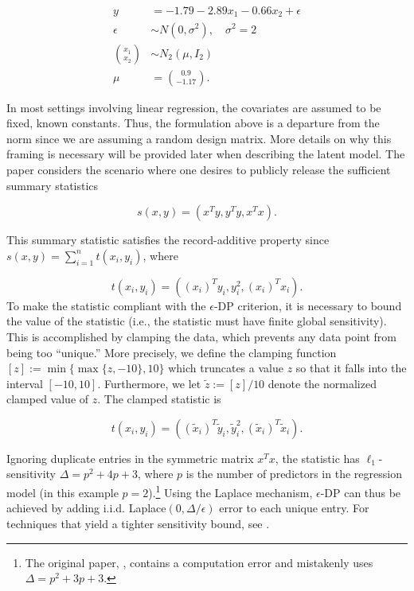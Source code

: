 \begin{equation*}
\begin{aligned}
y &= -1.79 -2.89x_1 -0.66x_2 + \epsilon\\
\epsilon &\sim N(0,\sigma^2), \quad \sigma^2 = 2\\
\binom{x_1}{x_2} &\sim N_{2}(\mu, I_2)\\
\mu &= \binom{0.9}{-1.17}.
\end{aligned}
\end{equation*}

In most settings involving linear regression, the covariates are assumed to be
fixed, known constants. Thus, the formulation above is a departure from the norm since
we are assuming a random design matrix. More details on why this framing is necessary
will be provided later when describing the latent model. The paper considers the scenario where one desires to publicly release the
sufficient summary statistics

\begin{equation*}
s(x,y) = (x^Ty, y^Ty, x^Tx).
\end{equation*}

This summary statistic satisfies the record-additive property since \(s(x,y) = \sum_{i=1}^{n} t(x_i, y_i)\),
where

\begin{equation*}
t(x_i,y_i) = ((x_{i})^T y_i, y_i^2, (x_{i})^T x_i).
\end{equation*}
To make the statistic compliant with
the \(\epsilon\)-DP criterion, it is
necessary to bound the value of the statistic
(i.e., the statistic must have finite global sensitivity). This is accomplished
by clamping the data, which prevents any data point from being too ``unique.''
More precisely, we define
the clamping function \([z] := \min\{\max\{z,-10\}, 10\}\) which truncates a value
\(z\) so that it falls into the interval \([-10,10]\). Furthermore, we let \(\tilde{z} := [z]/10\)
denote the normalized clamped value of \(z\). The clamped statistic is

\begin{equation*}
t(x_i,y_i) = ((\tilde{x}_{i})^T \tilde{y}_i, \tilde{y}_i^2, (\tilde{x}_{i})^T \tilde{x}_i).
\end{equation*}

Ignoring duplicate entries in the symmetric matrix \(x^Tx\), the statistic has \(\ell_1\)-sensitivity \(\Delta = p^2 + 4p + 3\),
where \(p\) is the number of predictors in the regression model (in this example \(p = 2\)).\footnote{The original paper, \citet{Ju2022}, contains a computation error and mistakenly uses \(\Delta = p^2 + 3p + 3\).}
Using the Laplace mechanism, \(\epsilon\)-DP can thus be achieved by adding i.i.d. Laplace\((0, \Delta/\epsilon)\)
error to each unique entry. For techniques that yield a tighter sensitivity bound,
see \citet{Awan2021}.

